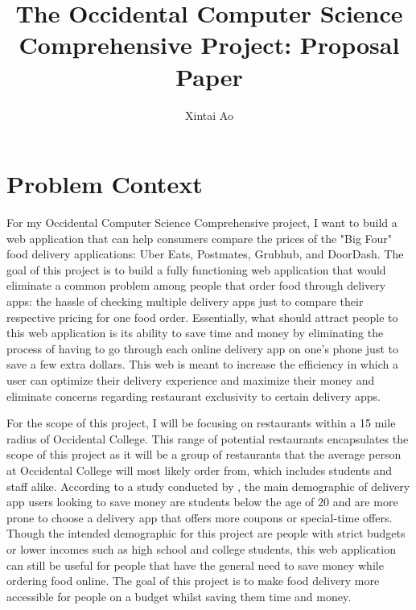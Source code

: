 \documentclass[10pt,twocolumn]{article}
\title{The Occidental Computer Science Comprehensive Project: Proposal Paper}
\author{Xintai Ao}
\affiliation{Occidental College}
\begin{document}
\maketitle
\section{Problem Context}

For my Occidental Computer Science Comprehensive project, I want to build a web application that can help consumers compare the prices of the "Big Four" food delivery applications: Uber Eats, Postmates, Grubhub, and DoorDash. The goal of this project is to build a fully functioning web application that would eliminate a common problem among people that order food through delivery apps: the hassle of checking multiple delivery apps just to compare their respective pricing for one food order. Essentially, what should attract people to this web application is its ability to save time and money by eliminating the process of having to go through each online delivery app on one's phone just to save a few extra dollars. This web is meant to increase the efficiency in which a user can optimize their delivery experience and maximize their money and eliminate concerns regarding restaurant exclusivity to certain delivery apps. 

For the scope of this project, I will be focusing on restaurants within a 15 mile radius of Occidental College. This range of potential restaurants encapsulates the scope of this project as it will be a group of restaurants that the average person at Occidental College will most likely order from, which includes students and staff alike. According to a study conducted by , the main demographic of delivery app users looking to save money are students below the age of 20 and are more prone to choose a delivery app that offers more coupons or special-time offers. Though the intended demographic for this project are people with strict budgets or lower incomes such as high school and college students, this web application can still be useful for people that have the general need to save money while ordering food online. The goal of this project is to make food delivery more accessible for people on a budget whilst saving them time and money. 
\end{document}

